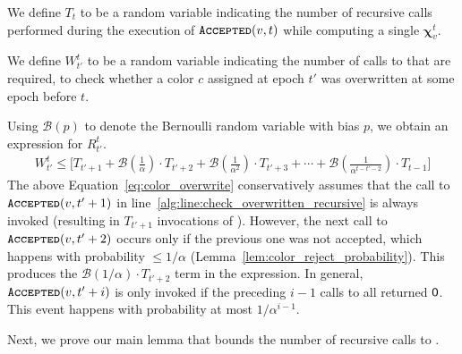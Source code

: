 \begin{definition}
\label{def:coloring_recursions}
We define $T_t$ to be a random variable indicating the number of recursive calls performed during the execution of $\texttt{\textsc{Accepted}}(v,t)$
while computing a single $\bm \chi_v^t$.
\end{definition}

\begin{definition}
\label{def:blah}
We define $W^t_{t'}$ to be a random variable indicating the number of calls to  that are required,
to check whether a color $c$ assigned at epoch $t'$ was overwritten at some epoch before $t$.
\end{definition}
Using $\mathcal B(p)$ to denote the Bernoulli random variable with bias $p$, we obtain an expression for $R^t_{t'}$.
\begin{align}
\label{eq:color_overwrite}
W^t_{t'} \le \Biggl[T_{t'+1} + \mathcal B\left(\frac{1}{\alpha}\right)\cdot T_{t'+2}
+ \mathcal B\left(\frac{1}{\alpha^2}\right)\cdot T_{t'+3} + \cdots
+ \mathcal B\left(\frac{1}{\alpha^{t-t'-2}}\right)\cdot T_{t-1} \Biggr]
\end{align}
The above Equation~\ref{eq:color_overwrite} conservatively assumes that the call to $\texttt{\textsc{Accepted}}(v, t'+1)$
in line~\ref{alg:line:check_overwritten_recursive} is always invoked (resulting in $T_{t'+1}$ invocations of ).
However, the next call to $\texttt{\textsc{Accepted}}(v, t'+2)$ occurs only if the previous one was not accepted,
which happens with probability $\le 1/\alpha$ (Lemma~\ref{lem:color_reject_probability}).
This produces the $\mathcal B(1/\alpha)\cdot T_{t'+2}$ term in the expression.
In general, $\texttt{\textsc{Accepted}}(v, t'+i)$ is only invoked if the preceding $i-1$ calls to  all returned $\mathsf{0}$.
This event happens with probability at most $1/\alpha^{i-1}$.

Next, we prove our main lemma that bounds the number of recursive calls to .

